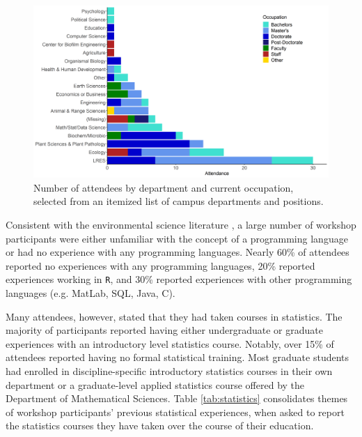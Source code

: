 \documentclass[12pt]{article}
\begin{document}
{
\begin{figure}[h!]
\centering
\includegraphics[width = \textwidth]{images/better_colors_attendance.png}
\caption{Number of attendees by department and current occupation, selected from
an itemized list of campus departments and positions.}
    \label{fig:departments}
\end{figure}
}

\quad Consistent with the environmental science literature \citep{andelman, 
hampton, hernandez, datacarpentry}, a large number of workshop participants were
either unfamiliar with the concept of a programming language or had no
experience with any programming languages. Nearly 60\% of attendees reported no
experiences with any programming languages, 20\% reported experiences working in
\texttt{R}, and 30\% reported experiences with other programming languages (e.g.
MatLab, SQL, Java, C). 

\quad Many attendees, however, stated that they had taken courses in statistics.
The majority of participants reported having either undergraduate or graduate
experiences with an introductory level statistics course. Notably, over 15\% of
attendees reported having no formal statistical training. Most graduate students
had enrolled in discipline-specific introductory statistics courses in their own
department or a graduate-level applied statistics course offered by the
Department of Mathematical Sciences. Table \ref{tab:statistics} consolidates 
themes of workshop participants' previous statistical experiences, when asked to
report the statistics courses they have taken over the course of their
education. 
\end{document}
